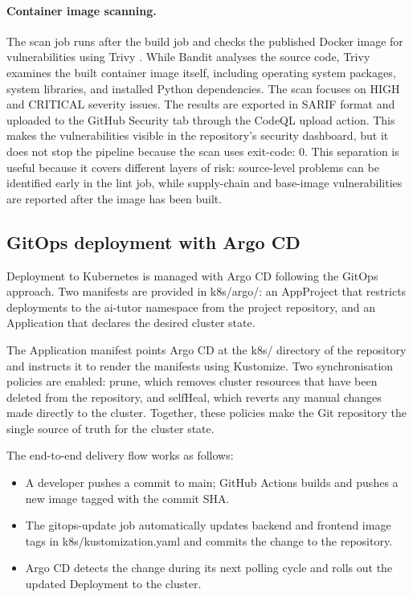 \paragraph{Container image scanning.}
The scan job runs after the build job and checks the published Docker image for vulnerabilities using Trivy \parencite{trivy}. While Bandit analyses the source code, Trivy examines the built container image itself, including operating system packages, system libraries, and installed Python dependencies. The scan focuses on HIGH and CRITICAL severity issues. The results are exported in SARIF format and uploaded to the GitHub Security tab through the CodeQL upload action. This makes the vulnerabilities visible in the repository’s security dashboard, but it does not stop the pipeline because the scan uses exit-code: 0. This separation is useful because it covers different layers of risk: source-level problems can be identified early in the lint job, while supply-chain and base-image vulnerabilities are reported after the image has been built.

\subsection{GitOps deployment with Argo CD}

Deployment to Kubernetes is managed with Argo CD following the GitOps approach. Two manifests are provided in k8s/argo/: an AppProject that restricts deployments to the ai-tutor namespace from the project repository, and an Application that declares the desired cluster state.

The Application manifest points Argo CD at the k8s/ directory of the repository and instructs it to render the manifests using Kustomize. Two synchronisation policies are enabled: prune, which removes cluster resources that have been deleted from the repository, and selfHeal, which reverts any manual changes made directly to the cluster. Together, these policies make the Git repository the single source of truth for the cluster state.

The end-to-end delivery flow works as follows:
\begin{itemize}
    \item A developer pushes a commit to main; GitHub Actions builds and pushes a new image tagged with the commit SHA.
    \item The gitops-update job automatically updates backend and frontend image tags in k8s/kustomization.yaml and commits the change to the repository.
    \item Argo CD detects the change during its next polling cycle and rolls out the updated Deployment to the cluster.
\end{itemize}

